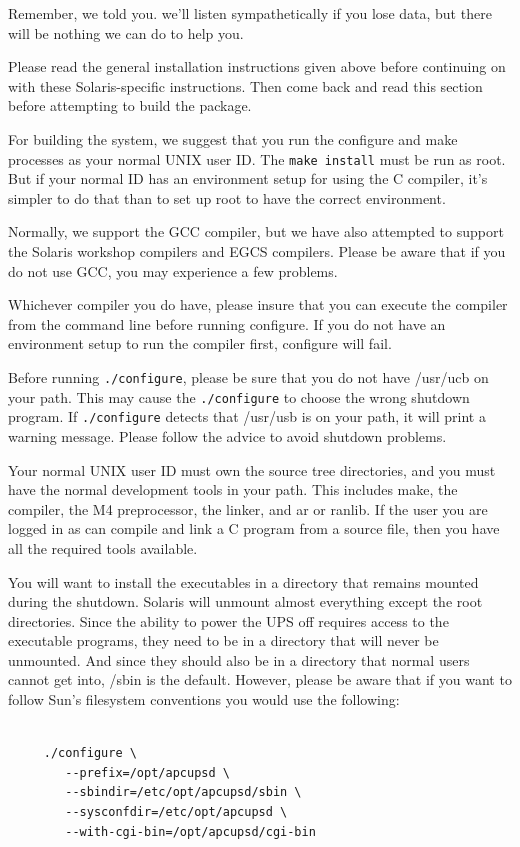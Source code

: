 Remember, we told you. we'll listen sympathetically if you lose data, but
there will be nothing we can do to help you.  

Please read the general installation instructions given above before
continuing on with these Solaris-specific instructions. Then come back and
read this section before attempting to build the package.  

For building the system, we suggest that you run the configure and make
processes as your normal UNIX user ID. The {\tt make install} must be run as
root. But if your normal ID has an environment setup for using the C compiler,
it's simpler to do that than to set up root to have the correct environment.  

Normally, we support the GCC compiler, but we have also attempted to support
the Solaris workshop compilers and EGCS compilers. Please be aware that if you
do not use GCC, you may experience a few problems.  

Whichever compiler you do have, please insure that you can execute the
compiler from the command line before running configure. If you do not have an
environment setup to run the compiler first, configure will fail.  

Before running {\tt ./configure}, please be sure that you do not have /usr/ucb
on your path. This may cause the {\tt ./configure} to choose the wrong
shutdown program. If {\tt ./configure} detects that /usr/usb is on your path,
it will print a warning message. Please follow the advice to avoid shutdown
problems.  

Your normal UNIX user ID must own the source tree directories, and you must
have the normal development tools in your path. This includes make, the
compiler, the M4 preprocessor, the linker, and ar or ranlib. If the user you
are logged in as can compile and link a C program from a source file, then you
have all the required tools available.  

You will want to install the executables in a directory that remains mounted
during the shutdown. Solaris will unmount almost everything except the root
directories. Since the ability to power the UPS off requires access to the
executable programs, they need to be in a directory that will never be
unmounted. And since they should also be in a directory that normal users
cannot get into, /sbin is the default. However, please be aware that if you
want to follow Sun's filesystem conventions you would use the following: 

\footnotesize
\begin{verbatim}
     
     ./configure \
        --prefix=/opt/apcupsd \
        --sbindir=/etc/opt/apcupsd/sbin \
        --sysconfdir=/etc/opt/apcupsd \
        --with-cgi-bin=/opt/apcupsd/cgi-bin
\end{verbatim}
\normalsize

